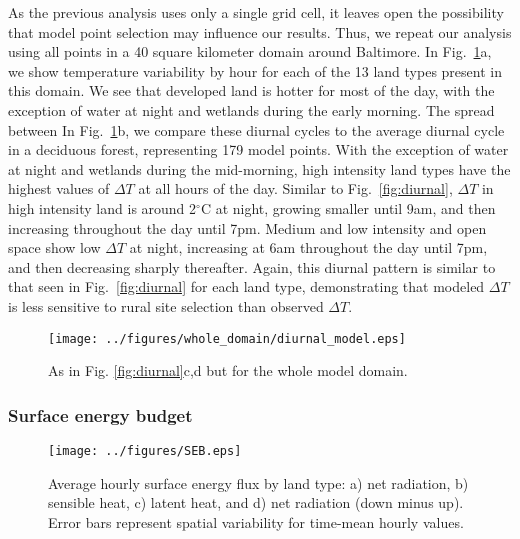 \documentclass[draft,linenumbers]{agujournal}
\begin{document}
As the previous analysis uses only a single grid cell, it leaves open the possibility that model point selection may influence our results. Thus, we repeat our analysis using all points in a 40 square kilometer domain around Baltimore. In Fig.~\ref{fig:diurnal_wd}a, we show temperature variability by hour for each of the 13 land types present in this domain. We see that developed land is hotter for most of the day, with the exception of water at night and wetlands during the early morning. The spread between 
In Fig.~\ref{fig:diurnal_wd}b, we compare these diurnal cycles to the average diurnal cycle in a deciduous forest, representing 179 model points. With the exception of water at night and wetlands during the mid-morning, high intensity land types have the highest values of $\Delta T$ at all hours of the day. Similar to Fig.~\ref{fig:diurnal}, $\Delta T$ in high intensity land is around 2$^\circ$C at night, growing smaller until 9am, and then increasing throughout the day until 7pm. Medium and low intensity and open space show low $\Delta T$ at night, increasing at 6am throughout the day until 7pm, and then decreasing sharply thereafter. Again, this diurnal pattern is similar to that seen in Fig.~\ref{fig:diurnal} for each land type, demonstrating that modeled $\Delta T$ is less sensitive to rural site selection than observed $\Delta T$. 

\begin{figure}
\centering
\texttt{[image: ../figures/whole\_domain/diurnal\_model.eps]}
\caption{As in Fig. \ref{fig:diurnal}c,d but for the whole model domain.}%
\label{fig:diurnal_wd}
\end{figure}

 
\subsubsection{Surface energy budget}

\begin{figure}[h]
\centering
\texttt{[image: ../figures/SEB.eps]}
\caption{Average hourly surface energy flux by land type: a) net radiation, b) sensible heat, c) latent heat, and d) net radiation (down minus up). Error bars represent spatial variability for time-mean hourly values.}
\label{fig:seb}
\end{figure}
\end{document}

